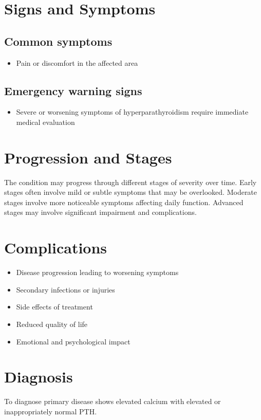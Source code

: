 \section{Signs and Symptoms}

\subsection{Common symptoms}
\begin{itemize}[noitemsep]
  \item Pain or discomfort in the affected area
  \end{itemize}

\subsection{Emergency warning signs}
\begin{itemize}[noitemsep]
  \item Severe or worsening symptoms of hyperparathyroidism require immediate medical evaluation
\end{itemize}
\section{Progression and Stages}
The condition may progress through different stages of severity over time. Early stages often involve mild or subtle symptoms that may be overlooked. Moderate stages involve more noticeable symptoms affecting daily function. Advanced stages may involve significant impairment and complications.
\section{Complications}
\begin{itemize}[noitemsep]
  \item Disease progression leading to worsening symptoms
  \item Secondary infections or injuries
  \item Side effects of treatment
  \item Reduced quality of life
  \item Emotional and psychological impact
\end{itemize}
\section{Diagnosis}
To diagnose primary disease shows elevated calcium with elevated or inappropriately normal PTH.

